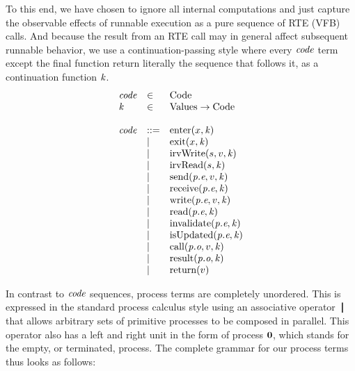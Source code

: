 \documentclass[twocolumn]{article}
\begin{document}
To this end, we have chosen to ignore all internal computations and just capture the observable effects of runnable execution as a pure sequence of RTE (VFB) calls. And because the result from an RTE call may in general affect subsequent runnable behavior, we use a continuation-passing style where every $\Code$ term except the final function return literally the sequence that follows it, as a continuation function $\Cont$.
%
\[
\begin{array}{lll}
  \Code & \in & \text{Code}								\\
  \Cont & \in & \text{Values} \rightarrow \text{Code}   \\ \\
  \Code & ::= & \Enter x \Cont               \\
        & |   & \Exit x \Cont                \\
        & |   & \IrvWrite s v \Cont          \\
        & |   & \IrvRead s \Cont             \\
        & |   & \Send {\Te e p} v \Cont      \\
        & |   & \Receive {\Te e p} \Cont     \\
        & |   & \Write {\Te e p} v \Cont     \\
        & |   & \Read {\Te e p} \Cont        \\
        & |   & \Invalidate {\Te e p} \Cont  \\
        & |   & \IsUpdated {\Te e p} \Cont   \\
        & |   & \Call {\To o p} v \Cont      \\
        & |   & \Result {\To o p} \Cont      \\
        & |   & \Return v                    \\
\end{array}
\]

In contrast to $\Code$ sequences, process terms are completely unordered. This is expressed in the standard process calculus style using an associative operator $\Tpar{}{}$ that allows arbitrary sets of primitive processes to be composed in parallel. This operator also has a left and right unit in the form of process $\textbf{0}$, which stands for the empty, or terminated, process. The complete grammar for our process terms thus looks as follows:
\end{document}
